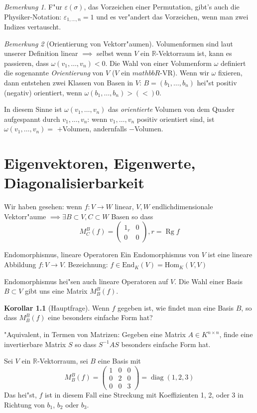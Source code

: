 \documentclass[oneside,fontsize=11pt,paper=a4,BCOR=0mm,DIV=12,automark,headsepline]{scrbook}
\DeclareMathOperator{\mRg}{Rg}
\DeclareMathOperator{\mDiag}{diag}
\theoremstyle{remark}
\theoremstyle{definition}
\newtheorem*{korollar}{Korollar}
\theoremstyle{definition}
\theoremstyle{remark}
\newtheorem*{bem}{Bemerkung}
\begin{document}
\begin{bem}
	F"ur \(\varepsilon(\sigma)\), das Vorzeichen einer Permutation, gibt's auch die Physiker-Notation: \(\varepsilon_{1,\dots,n}=1\) und es ver"andert das Vorzeichen, wenn man zwei Indizes vertauscht.
\end{bem}
\begin{bem}[Orientierung von Vektorr"aumen]
	Volumenformen sind laut unserer Definition linear \(\implies\) selbst wenn \(V\) ein \(\mathbb{R}\)-Vektorraum ist, kann es passieren, dass \(\omega(v_1,\dots,v_n)< 0\). Die Wahl von einer Volumenform \(\omega\) definiert die sogenannte \emph{Orientierung} von \(V\) (\(V\) ein \(mathbb{R}\)-VR). Wenn wir \(\omega\) fixieren, dann entstehen zwei Klassen von Basen in \(V\): \(B = (b_1,\dots,b_n)\) hei"st positiv (negativ) orientiert, wenn \(\omega(b_1,\dots,b_n) > (<) 0\). 
	
	In diesem Sinne ist \(\omega(v_1,\dots,v_n)\) das \emph{orientierte} Volumen von dem Quader aufgespannt durch \(v_1,\dots,v_n\): wenn \(v_1,\dots,v_n\) positiv orientiert sind, ist \(\omega(v_1,\dots,v_n) = \) \(+\)Volumen, andernfalls \(-\)Volumen.
\end{bem}

\chapter{Eigenvektoren, Eigenwerte, Diagonalisierbarkeit}

Wir haben gesehen: wenn \(f: V\to W\) linear, \(V, W\) endlichdimensionale Vektorr"aume \(\implies \exists B\subset V, C\subset W \) Basen so dass
\[M^B_C(f) = \begin{pmatrix}
1_r & 0\\
0 & 0
\end{pmatrix}, r = \mRg f\]

\begin{definition}{Endomorphismus, lineare Operatoren}{}
	Ein Endomorphismus von \(V\) ist eine lineare Abbildung \(f: V\to V\). Bezeichnung: \(f\in \text{End}_K(V) = \text{Hom}_K(V,V) \)	
	
	Endomorphismus hei"sen auch lineare Operatoren auf \(V\). Die Wahl einer Basis \(B\subset V \) gibt uns eine Matrix \(M^B_B(f)\).
\end{definition}
\begin{korollar}[Hauptfrage]
	Wenn \(f\) gegeben ist, wie findet man eine Basis \(B\), so dass \(M^B_B(f)\) eine besonders einfache Form hat?
	
	"Aquivalent, in Termen von Matrizen: Gegeben eine Matrix \(A\in K^{n\times n} \), finde eine invertierbare Matrix \(S\) so dass \(S^{-1}AS\) besonders einfache Form hat.
\end{korollar}
  Sei \(V\) ein \(\mathbb{R}\)-Vektorraum, sei \(B\) eine Basis mit \[M^B_B(f) =
    \begin{pmatrix}
      1 & 0 & 0 \\
      0 & 2 & 0 \\
      0 & 0 & 3
    \end{pmatrix} = \mDiag(1,2,3) \]
  Das hei"st, \(f\) ist in diesem Fall eine Streckung mit Koeffizienten 1, 2, oder 3 in Richtung von \(b_1\), \(b_2\) oder \(b_{3}\).
\end{document}
